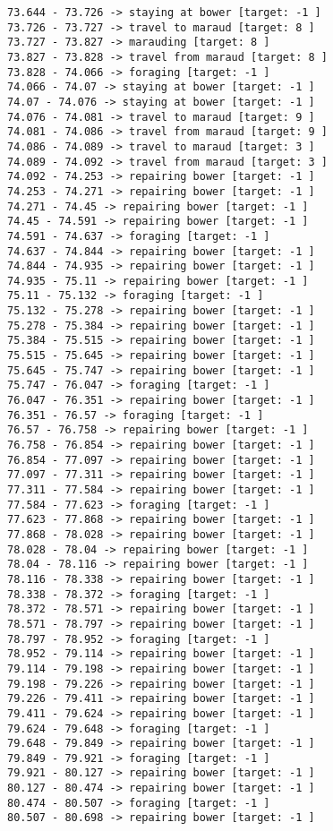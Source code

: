 \documentclass[11pt]{article}
\begin{document}
\begin{Verbatim}[commandchars=\\\{\}]
73.644 - 73.726 -> staying at bower [target: -1 ]
73.726 - 73.727 -> travel to maraud [target: 8 ]
73.727 - 73.827 -> marauding [target: 8 ]
73.827 - 73.828 -> travel from maraud [target: 8 ]
73.828 - 74.066 -> foraging [target: -1 ]
74.066 - 74.07 -> staying at bower [target: -1 ]
74.07 - 74.076 -> staying at bower [target: -1 ]
74.076 - 74.081 -> travel to maraud [target: 9 ]
74.081 - 74.086 -> travel from maraud [target: 9 ]
74.086 - 74.089 -> travel to maraud [target: 3 ]
74.089 - 74.092 -> travel from maraud [target: 3 ]
74.092 - 74.253 -> repairing bower [target: -1 ]
74.253 - 74.271 -> repairing bower [target: -1 ]
74.271 - 74.45 -> repairing bower [target: -1 ]
74.45 - 74.591 -> repairing bower [target: -1 ]
74.591 - 74.637 -> foraging [target: -1 ]
74.637 - 74.844 -> repairing bower [target: -1 ]
74.844 - 74.935 -> repairing bower [target: -1 ]
74.935 - 75.11 -> repairing bower [target: -1 ]
75.11 - 75.132 -> foraging [target: -1 ]
75.132 - 75.278 -> repairing bower [target: -1 ]
75.278 - 75.384 -> repairing bower [target: -1 ]
75.384 - 75.515 -> repairing bower [target: -1 ]
75.515 - 75.645 -> repairing bower [target: -1 ]
75.645 - 75.747 -> repairing bower [target: -1 ]
75.747 - 76.047 -> foraging [target: -1 ]
76.047 - 76.351 -> repairing bower [target: -1 ]
76.351 - 76.57 -> foraging [target: -1 ]
76.57 - 76.758 -> repairing bower [target: -1 ]
76.758 - 76.854 -> repairing bower [target: -1 ]
76.854 - 77.097 -> repairing bower [target: -1 ]
77.097 - 77.311 -> repairing bower [target: -1 ]
77.311 - 77.584 -> repairing bower [target: -1 ]
77.584 - 77.623 -> foraging [target: -1 ]
77.623 - 77.868 -> repairing bower [target: -1 ]
77.868 - 78.028 -> repairing bower [target: -1 ]
78.028 - 78.04 -> repairing bower [target: -1 ]
78.04 - 78.116 -> repairing bower [target: -1 ]
78.116 - 78.338 -> repairing bower [target: -1 ]
78.338 - 78.372 -> foraging [target: -1 ]
78.372 - 78.571 -> repairing bower [target: -1 ]
78.571 - 78.797 -> repairing bower [target: -1 ]
78.797 - 78.952 -> foraging [target: -1 ]
78.952 - 79.114 -> repairing bower [target: -1 ]
79.114 - 79.198 -> repairing bower [target: -1 ]
79.198 - 79.226 -> repairing bower [target: -1 ]
79.226 - 79.411 -> repairing bower [target: -1 ]
79.411 - 79.624 -> repairing bower [target: -1 ]
79.624 - 79.648 -> foraging [target: -1 ]
79.648 - 79.849 -> repairing bower [target: -1 ]
79.849 - 79.921 -> foraging [target: -1 ]
79.921 - 80.127 -> repairing bower [target: -1 ]
80.127 - 80.474 -> repairing bower [target: -1 ]
80.474 - 80.507 -> foraging [target: -1 ]
80.507 - 80.698 -> repairing bower [target: -1 ]

\end{Verbatim}
\end{document}
